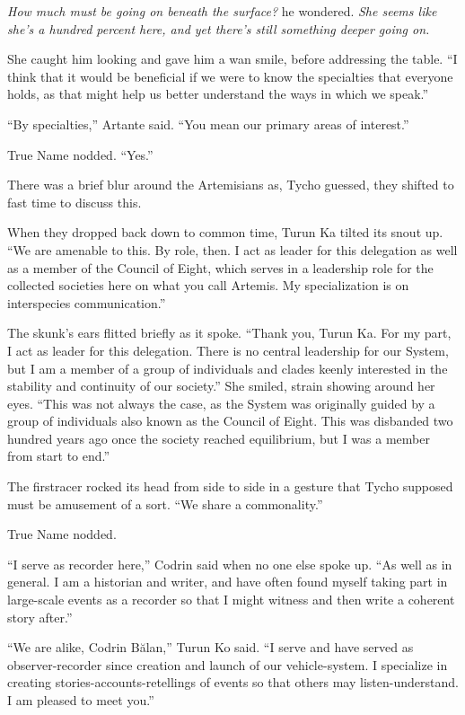 \emph{How much must be going on beneath the surface?} he wondered. \emph{She seems like she's a hundred percent here, and yet there's still something deeper going on.}

She caught him looking and gave him a wan smile, before addressing the table. ``I think that it would be beneficial if we were to know the specialties that everyone holds, as that might help us better understand the ways in which we speak.''

``By specialties,'' Artante said. ``You mean our primary areas of interest.''

True Name nodded. ``Yes.''

There was a brief blur around the Artemisians as, Tycho guessed, they shifted to fast time to discuss this.

When they dropped back down to common time, Turun Ka tilted its snout up. ``We are amenable to this. By role, then. I act as leader for this delegation as well as a member of the Council of Eight, which serves in a leadership role for the collected societies here on what you call Artemis. My specialization is on interspecies communication.''

The skunk's ears flitted briefly as it spoke. ``Thank you, Turun Ka. For my part, I act as leader for this delegation. There is no central leadership for our System, but I am a member of a group of individuals and clades keenly interested in the stability and continuity of our society.'' She smiled, strain showing around her eyes. ``This was not always the case, as the System was originally guided by a group of individuals also known as the Council of Eight. This was disbanded two hundred years ago once the society reached equilibrium, but I was a member from start to end.''

The firstracer rocked its head from side to side in a gesture that Tycho supposed must be amusement of a sort. ``We share a commonality.''

True Name nodded.

``I serve as recorder here,'' Codrin said when no one else spoke up. ``As well as in general. I am a historian and writer, and have often found myself taking part in large-scale events as a recorder so that I might witness and then write a coherent story after.''

``We are alike, Codrin Bălan,'' Turun Ko said. ``I serve and have served as observer-recorder since creation and launch of our vehicle-system. I specialize in creating stories-accounts-retellings of events so that others may listen-understand. I am pleased to meet you.''

